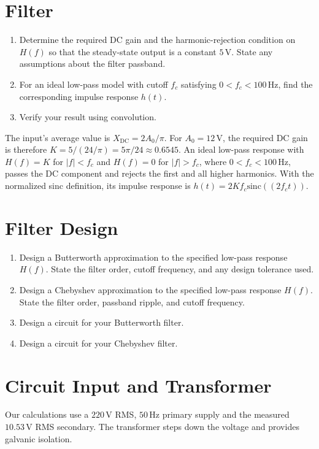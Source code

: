 \documentclass[journal,12pt,twocolumn]{IEEEtran}
\renewcommand\thesection{\arabic{section}}
\theoremstyle{definition}
\providecommand{\sinc}[1]{\text{sinc}\ensuremath{\left(#1\right)}}
\theoremstyle{remark}
\numberwithin{equation}{section}
\begin{document}
\FloatBarrier
\section{Filter}
\begin{enumerate}[label=\thesection.\arabic*,
                  ref=\thesection.\theenumi]
    \item Determine the required DC gain and the harmonic-rejection condition on $H(f)$ so that the steady-state output is a constant $5\,\mathrm{V}$. State any assumptions about the filter passband.
    \item For an ideal low-pass model with cutoff $f_c$ satisfying $0<f_c<100\,\mathrm{Hz}$, find the corresponding impulse response $h(t)$.
    \item Verify your result using convolution.
\end{enumerate}

The input's average value is $X_{\mathrm{DC}}=2A_0/\pi$.
For $A_0=12\,\mathrm{V}$, the required DC gain is therefore
$K=5/(24/\pi)=5\pi/24\approx0.6545$. An ideal low-pass response
with $H(f)=K$ for $|f|<f_c$ and $H(f)=0$ for $|f|>f_c$, where
$0<f_c<100\,\mathrm{Hz}$, passes the DC component and rejects the
first and all higher harmonics. With the normalized sinc definition,
its impulse response is $h(t)=2Kf_c\sinc{(2f_ct)}$.

\FloatBarrier
\section{Filter Design}
\begin{enumerate}[label=\thesection.\arabic*,
                  ref=\thesection.\theenumi]
    \item Design a Butterworth approximation to the specified low-pass response $H(f)$. State the filter order, cutoff frequency, and any design tolerance used.
    \item Design a Chebyshev approximation to the specified low-pass response $H(f)$. State the filter order, passband ripple, and cutoff frequency.
    \item Design a circuit for your Butterworth filter.
    \item Design a circuit for your Chebyshev filter.
\end{enumerate}


\FloatBarrier
\section{Circuit Input and Transformer}
Our calculations use a $220\,\mathrm{V}$ RMS, $50\,\mathrm{Hz}$
primary supply and the measured $10.53\,\mathrm{V}$ RMS secondary.
The transformer steps down the voltage and provides galvanic isolation.
\end{document}
